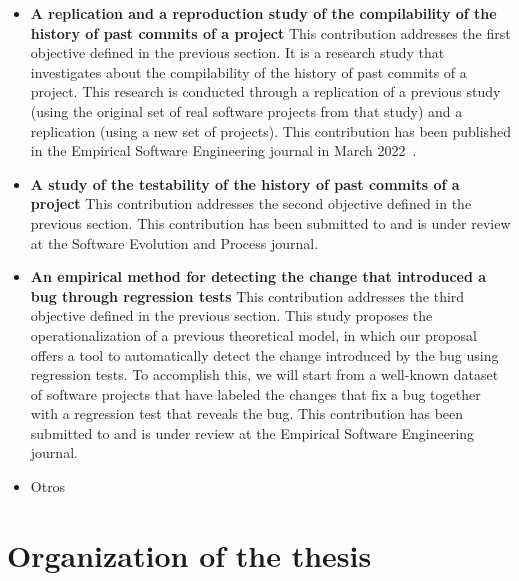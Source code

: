 \begin{itemize}
    \item \textbf{A replication and a reproduction study of the compilability of the history of past commits of a project}
    This contribution addresses the first objective defined in the previous section.
    It is a research study that investigates about the compilability of the history of past commits of a project.
    This research is conducted through a replication of a previous study~\cite{tufano2017there} (using the original set of real software projects from that study) and a replication (using a new set of projects).
    This contribution has been published in the Empirical Software Engineering journal in March 2022~\cite{maes2022revisiting}.
    \item \textbf{A study of the testability of the history of past commits of a project}
    This contribution addresses the second objective defined in the previous section.
    This contribution has been submitted to and is under review at the Software Evolution and Process journal.
    \item \textbf{An empirical method for detecting the change that introduced a bug through regression tests}
    This contribution addresses the third objective defined in the previous section. 
    This study proposes the operationalization of a previous theoretical model, in which our proposal offers a tool to automatically detect the change introduced by the bug using regression tests. To accomplish this, we will start from a well-known dataset of software projects that have labeled the changes that fix a bug together with a regression test that reveals the bug.
    This contribution has been submitted to and is under review at the Empirical Software Engineering journal.
    \item{Otros} 
\end{itemize}

\section{Organization of the thesis}

